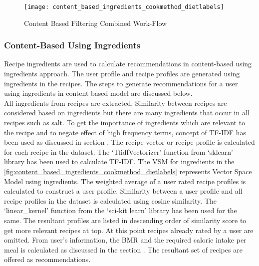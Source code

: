\begin{singlespace}
\begin{figure}[H]
	\centering
	\texttt{[image: content\_based\_ingredients\_cookmethod\_dietlabels]}
	\caption{Content Based Filtering Combined Work-Flow }
	\label{fig:content_based_ingredients_cookmethod_dietlabels}
\end{figure}  
\end{singlespace}


\subsubsection{Content-Based Using Ingredients}
\label{sec:cb_ingredients}
Recipe ingredients are used to calculate recommendations in content-based using ingredients approach. The user profile and recipe profiles are generated using ingredients in the recipes. The steps to generate recommendations for a user using ingredients in content based model are discussed below.\\
All ingredients from recipes are extracted. Similarity between recipes are considered based on ingredients but there are many ingredients that occur in all recipes such as salt. To get the importance of ingredients which are relevant to the recipe and to negate effect of high frequency terms, concept of TF-IDF has been used as discussed in section . The recipe vector or recipe profile is calculated for each recipe in the dataset. The \lq{}TfidfVectorizer\rq{} function from \lq{}sklearn\rq{} library has been used to calculate TF-IDF. The VSM for ingredients in the \autoref{fig:content_based_ingredients_cookmethod_dietlabels} represents Vector Space Model using ingredients. The weighted average of a user rated recipe profiles is calculated to construct a user profile. Similarity between a user profile and all recipe profiles in the dataset is calculated using cosine similarity. The \lq{}linear\_kernel\rq{} function from the \lq{}sci-kit learn\rq{} library has been used for the same. The resultant profiles are listed in descending order of similarity score to get more relevant recipes at top. At this point recipes already rated by a user are omitted. From user's information, the BMR and the required calorie intake per meal is calculated as discussed in the section . The resultant set of recipes are offered as recommendations. 

